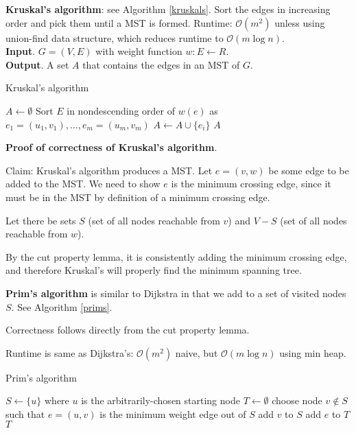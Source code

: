 \documentclass{article}
\newcommand{\Oh}{\mathcal{O}}
\begin{document}
\textbf{Kruskal's algorithm}: see Algorithm \ref{kruskals}. Sort the edges in increasing order and pick them until a MST is formed. Runtime: $\Oh(m^2)$ unless using union-find data structure, which reduces runtime to $\Oh(m \log n)$.\\

\textbf{Input}. $G = (V, E)$ with weight function $w: E \leftarrow R$.\\
\textbf{Output}. A set $A$ that contains the edges in an MST of $G$.\\

\begin{algorithm}
\caption{Kruskal's algorithm}\label{kruskals}
\begin{algorithmic}[1]
\State $A \gets \emptyset$
\State Sort $E$ in nondescending order of $w(e)$ as $e_1 = (u_1, v_1), \dots, e_m = (u_m, v_m)$
        \State $A \gets A \cup \{e_i\}$
    \EndIf
\EndFor
\State \Return $A$
\EndProcedure
\end{algorithmic}
\end{algorithm}

\textbf{Proof of correctness of Kruskal's algorithm}.

Claim: Kruskal's algorithm produces a MST. Let $e = (v, w)$ be some edge to be added to the MST. We need to show $e$ is the minimum crossing edge, since it must be in the MST by definition of a minimum crossing edge.

Let there be sets $S$ (set of all nodes reachable from $v$) and $V - S$ (set of all nodes reachable from $w$).

By the cut property lemma, it is consistently adding the minimum crossing edge, and therefore Kruskal's will properly find the minimum spanning tree.

\textbf{Prim's algorithm} is similar to Dijkstra in that we add to a set of visited nodes $S$. See Algorithm \ref{prims}.

Correctness follows directly from the cut property lemma.

Runtime is same as Dijkstra's: $\Oh(m^2)$ naive, but $\Oh(m \log n)$ using min heap.

\begin{algorithm}
\caption{Prim's algorithm}\label{prims}
\begin{algorithmic}[1]
\State $S \gets \{u\}$ where $u$ is the arbitrarily-chosen starting node
\State $T \gets \emptyset$
    \State choose node $v \notin S$ such that $e = (u, v)$ is the minimum weight edge out of $S$ 
    \State add $v$ to $S$
    \State add $e$ to $T$
\EndWhile
\State \Return $T$
\EndProcedure
\end{algorithmic}
\end{algorithm}
\end{document}
